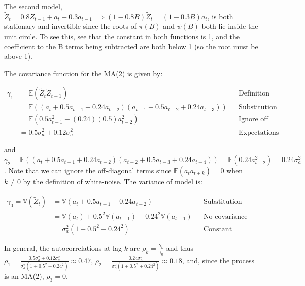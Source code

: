 \documentclass[12pt, letterpaper]{article}
\theoremstyle{definition}
\numberwithin{equation}{section}
\newcommand{\+}[1]{+_{\scalebox{.375}{#1}}}
\newcommand{\E}{\mathbb{E}}
\newcommand{\V}{\mathbb{V}}
\newcommand{\1}{\mathbbm{1}}
\begin{document}
The second model, $\tilde{Z}_t=0.8Z_{t-1}+a_t-0.3a_{t-1} \implies (1-0.8B)\tilde{Z}_t=(1-0.3B)a_t$, is both stationary and invertible since the roots of $\pi(B)$ and $\psi(B)$ both lie inside the unit circle. To see this, see that the constant in both functions is 1, and the coefficient to the B terms being subtracted are both below 1 (so the root must be above 1).




\newpage
\textbf{}
\vspace{\baselineskip}

The covariance function for the MA(2) is given by:

\vspace{-0.5cm}
\begin{align*}
	\gamma_1&=\E(\tilde{Z}_{t}\tilde{Z}_{t-1}) &&\text{Definition}\\
	&=\E\left(\left(a_t+0.5a_{t-1}+0.24a_{t-2}\right)\left(a_{t-1}+0.5a_{t-2}+0.24a_{t-3}\right)\right) &&\text{Substitution}\\
	&=\E(0.5a_{t-1}^2+(0.24)(0.5)a_{t-2}^2) &&\text{Ignore off diagonal terms}\\
	&=0.5\sigma_a^2+0.12\sigma_a^2 &&\text{Expectations are linear}
\end{align*}

and	$\gamma_2=\E\left(\left(a_t+0.5a_{t-1}+0.24a_{t-2}\right)\left(a_{t-2}+0.5a_{t-3}+0.24a_{t-4}\right)\right)=\E(0.24a_{t-2}^2)=0.24\sigma_a^2$. Note that we can ignore the off-diagonal terms since $\E(a_t a_{t+k})=0$ when $k \neq 0$ by the definition of white-noise. The variance of model is:

\vspace{-0.5cm}
\begin{align*}
	\gamma_0=\V(\tilde{Z}_t)&=\V(a_t+0.5a_{t-1}+0.24a_{t-2}) &&\text{Substitution}\\
	&=\V(a_t)+0.5^2\V(a_{t-1})+0.24^2\V(a_{t-1}) &&\text{No covariance between terms}\\
	&=\sigma_a^2(1+0.5^2+0.24^2) &&\text{Constant variance assumption}
\end{align*}

In general, the autocorrelations at lag $k$ are $\rho_{k}=\frac{\gamma_k}{\gamma_0}$ and thus $\rho_1=\frac{0.5\sigma_a^2+0.12\sigma_a^2}{\sigma_a^2(1+0.5^2+0.24^2)}\approx 0.47$, $\rho_2=\frac{0.24\sigma_a^2}{\sigma_a^2(1+0.5^2+0.24^2)}\approx0.18$, and, since the process is an MA(2), $\rho_3=0$.
\vspace{\baselineskip}
\end{document}
